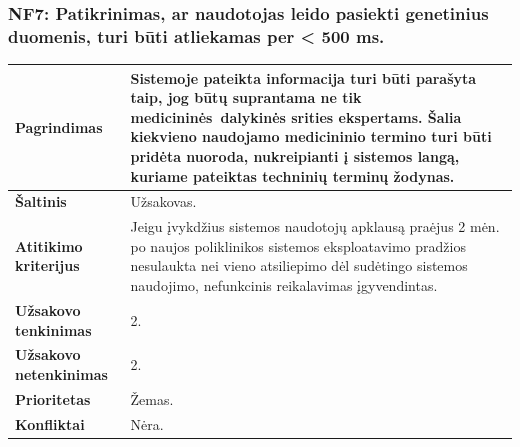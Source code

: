 \documentclass[12pt]{article}
\begin{document}
\subsubsection*{NF7: Patikrinimas, ar naudotojas leido pasiekti genetinius
duomenis, turi būti atliekamas per < 500 ms.}
\label{sec:NF7}
\begin{table}[htb!]
    \captionsetup{justification=centering}
    \begin{tabular}{|m{4.9cm}|m{11cm}|}
        \hline
        \raggedleft \textbf{\cellcolor{deepchampagne}Pagrindimas} &
        Sistemoje pateikta informacija turi būti parašyta taip, jog būtų
        suprantama ne tik medicininės dalykinės srities ekspertams. Šalia
        kiekvieno naudojamo medicininio termino turi būti pridėta nuoroda,
        nukreipianti į sistemos langą, kuriame pateiktas techninių terminų
        žodynas. \\
        \hline
        \raggedleft \textbf{\cellcolor{deepchampagne}Šaltinis} & Užsakovas. \\
        \hline
        \raggedleft \textbf{\cellcolor{deepchampagne}Atitikimo kriterijus} & 
        Jeigu įvykdžius sistemos naudotojų apklausą praėjus 2 mėn. po naujos
        poliklinikos sistemos eksploatavimo pradžios nesulaukta nei vieno
        atsiliepimo dėl sudėtingo sistemos naudojimo, nefunkcinis reikalavimas
        įgyvendintas. \\
        \hline
        \raggedleft \textbf{\cellcolor{deepchampagne}Užsakovo tenkinimas} & 2. \\
        \hline
        \raggedleft \textbf{\cellcolor{deepchampagne}Užsakovo netenkinimas} & 2. \\
        \hline
        \raggedleft \textbf{\cellcolor{deepchampagne}Prioritetas} & Žemas. \\
        \hline
        \raggedleft \textbf{\cellcolor{deepchampagne}Konfliktai} & Nėra. \\
        \hline
    \end{tabular}
\end{table}


\end{document}
